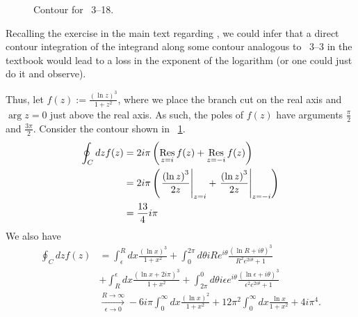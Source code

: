 \item

\begin{figure}[h]
	\centering
	\caption{Contour for ~3--18.}%
	\label{fig:problem3-18}
\end{figure}

Recalling the exercise in the main text regarding ,
we could infer that a direct contour integration of the integrand along some contour analogous to ~3--3
in the textbook would lead to a loss in the exponent of the logarithm (or one could just do it and observe).

Thus, let $f(z) := \frac{{\left( \ln z \right)}^3}{1 + z^2}$,
where we place the branch cut on the real axis and $\arg z = 0$ just above the real axis.
As such, the poles of $f(z)$ have arguments $\frac{\pi}{2}$ and $\frac{3\pi}{2}$.
Consider the contour shown in ~\ref{fig:problem3-18}.
\begin{align*}
	\oint_C dz f(z)
	&= 2i\pi \left( \mathop{\mathrm{Res}}_{z=i} f(z) + \mathop{\mathrm{Res}}_{z=-i} f(z) \right) \\
	&= 2i\pi \left( {\left. \frac{{\left( \ln z \right)}^3}{2z} \right|}_{z=i} + {\left. \frac{{\left( \ln z \right)}^3}{2z} \right|}_{z=-i} \right) \\
	&= \frac{13}{4}i\pi
\end{align*}
We also have
\begin{align*}
    \oint_C dz f(z)
    &= \int_\epsilon^R dx \frac{{\left( \ln x \right)}^3}{1 +x^2}
     + \int_0^{2\pi} d\theta iRe^{i\theta} \frac{{\left( \ln R + i\theta\right)}^3}{R^2 e^{2i\theta} + 1} \\
    &+ \int_R^\epsilon dx \frac{{\left( \ln x + 2i\pi \right)}^3}{1 + x^2}
     + \int_{2\pi}^0 d\theta i\epsilon e^{i\theta} \frac{{\left(\ln\epsilon + i\theta\right)}^3}{\epsilon^2 e^{2i\theta} + 1} \\
    &\xrightarrow[\epsilon \rightarrow 0]{R \rightarrow \infty}
        -6i\pi \int_0^\infty dx \frac{{\left( \ln x \right)}^2}{1 + x^2}
	+ 12\pi^2 \int_0^\infty dx \frac{\ln x}{1 + x^2}
	+ 4i\pi^4.
\end{align*}


